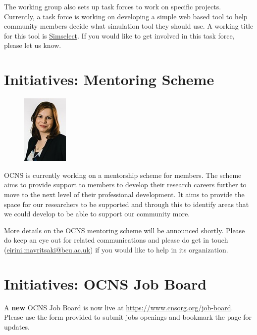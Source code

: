 \documentclass[11pt,a4paper,oneside]{article}
\begin{document}
The working group also sets up task forces to work on specific projects.
Currently, a task force is working on developing a simple web based tool to help community members decide what simulation tool they should use.
A working title for this tool is \href{https://github.com/OCNS/simselect/issues}{Simselect}. 
If you would like to get involved in this task force, please let us know.

\section*{Initiatives: Mentoring Scheme}%
\begin{figure}
  \includegraphics[width=0.2\textwidth]{images/Mavritsaki}
\end{figure}

OCNS is currently working on a mentorship scheme for members.
The scheme aims to provide support to members to develop their research careers further to move to the next level of their professional development.
It aims to provide the space for our researchers to be supported and through this to identify areas that we could develop to be able to support our community more.

More details on the OCNS mentoring scheme will be announced shortly.
Please do keep an eye out for related communications and please do get in touch (\href{mailto:eirini.mavritsaki@bcu.ac.uk}{eirini.mavritsaki@bcu.ac.uk}) if you would like to help in its organization.

\vspace{7ex}
\section*{Initiatives: OCNS Job Board}%
\sectionauthor{\vspace{-4ex}}

A \textbf{new} OCNS Job Board is now live at \url{https://www.cnsorg.org/job-board}.
Please use the form provided to submit jobs openings and bookmark the page for updates.
\end{document}
